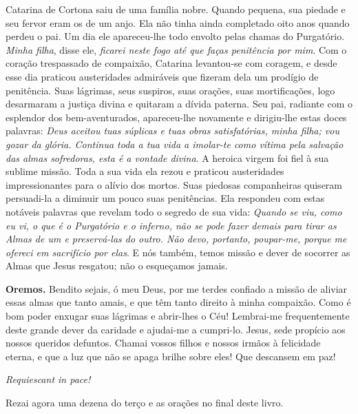 Catarina de Cortona saiu de uma família nobre. Quando pequena, sua piedade e seu fervor eram os de um anjo. Ela não tinha ainda completado oito anos quando perdeu o pai. Um dia ele apareceu-lhe todo envolto pelas chamas do Purgatório. \textit{Minha filha}, disse ele, \textit{ficarei neste fogo até que faças penitência por mim}. Com o coração trespassado de compaixão, Catarina levantou-se com coragem, e desde esse dia praticou austeridades admiráveis que fizeram dela um prodígio de penitência. Suas lágrimas, seus suspiros, suas orações, suas mortificações, logo desarmaram a justiça divina e quitaram a dívida paterna. Seu pai, radiante com o esplendor dos bem-aventurados, apareceu-lhe novamente e dirigiu-lhe estas doces palavras: \textit{Deus aceitou tuas súplicas e tuas obras satisfatórias, minha filha; vou gozar da glória. Continua toda a tua vida a imolar-te como vítima pela salvação das almas sofredoras, esta é a vontade divina}. A heroica virgem foi fiel à sua sublime missão. Toda a sua vida ela rezou e praticou austeridades impressionantes para o alívio dos mortos. Suas piedosas companheiras quiseram persuadi-la a diminuir um pouco suas penitências. Ela respondeu com estas notáveis palavras que revelam todo o segredo de sua vida: \textit{Quando se viu, como eu vi, o que é o Purgatório e o inferno, não se pode fazer demais para tirar as Almas de um e preservá-las do outro. Não devo, portanto, poupar-me, porque me ofereci em sacrifício por elas}. E nós também, temos missão e dever de socorrer as Almas que Jesus resgatou; não o esqueçamos jamais.


\vspace{\baselineskip}\noindent \textbf{Oremos.} Bendito sejais, ó meu Deus, por me terdes confiado a missão de aliviar essas almas que tanto amais, e que têm tanto direito à minha compaixão. Como é bom poder enxugar suas lágrimas e abrir-lhes o Céu! Lembrai-me frequentemente deste grande dever da caridade e ajudai-me a cumpri-lo. Jesus, sede propício aos nossos queridos defuntos. Chamai vossos filhos e nossos irmãos à felicidade eterna, e que a luz que não se apaga brilhe sobre eles! Que descansem em paz!



\begin{center}
\textit{Requiescant in pace!}
\end{center}

Rezai agora uma dezena do terço e as orações no final deste livro.
